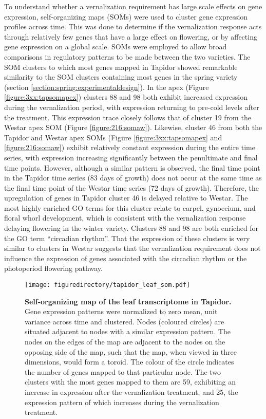 \documentclass[12pt,]{book}
\begin{document}
To understand whether a vernalization requirement has large scale
effects on gene expression, self-organizing maps (SOMs) were used to
cluster gene expression profiles across time. This was done to determine
if the vernalization response acts through relatively few genes that
have a large effect on flowering, or by affecting gene expression on a
global scale. SOMs were employed to allow broad comparisons in
regulatory patterns to be made between the two varieties. The SOM
clusters to which most genes mapped in Tapidor showed remarkable
similarity to the SOM clusters containing most genes in the spring
variety (section \ref{section:spring:experimentaldesign}). In the apex
(Figure \ref{figure:3xx:tapsomapex}) clusters 88 and 98 both exhibit
increased expression during the vernalization period, with expression
returning to pre-cold levels after the treatment. This expression trace
closely follows that of cluster 19 from the Westar apex SOM (Figure
\ref{figure:216:somaw}). Likewise, cluster 46 from both the Tapidor and
Westar apex SOMs (Figure \ref{figure:3xx:tapsomapex} and
\ref{figure:216:somaw}) exhibit relatively constant expression during
the entire time series, with expression increasing significantly between
the penultimate and final time points. However, although a similar
pattern is observed, the final time point in the Tapidor time series (83
days of growth) does not occur at the same time as the final time point
of the Westar time series (72 days of growth). Therefore, the
upregulation of genes in Tapidor cluster 46 is delayed relative to
Westar. The most highly enriched GO terms for this cluster relate to
carpel, gynoecium, and floral whorl development, which is consistent
with the vernalization response delaying flowering in the winter
variety. Clusters 88 and 98 are both enriched for the GO term
``circadian rhythm''. That the expression of these clusters is very
similar to clusters in Westar suggests that the vernalization
requirement does not influence the expression of genes associated with
the circadian rhythm or the photoperiod flowering pathway.

\begin{figure}[htbp]
\centering
\texttt{[image: figuredirectory/tapidor\_leaf\_som.pdf]}
\caption{\textbf{Self-organizing map of the leaf transcriptome in
Tapidor.} Gene expression patterns were normalized to zero mean, unit
variance across time and clustered. Nodes (coloured circles) are
situated adjacent to nodes with a similar expression pattern. The nodes
on the edges of the map are adjacent to the nodes on the opposing side
of the map, such that the map, when viewed in three dimensions, would
form a toroid. The colour of the circle indicates the number of genes
mapped to that particular node. The two clusters with the most genes
mapped to them are 59, exhibiting an increase in expression after the
vernalization treatment, and 25, the expression pattern of which
increases during the vernalization
treatment.}\label{figure:3xx:tapsomleaf}
\end{figure}
\end{document}

